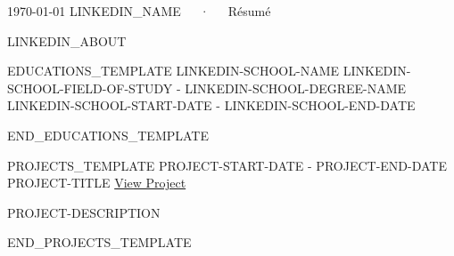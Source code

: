 \documentclass[11pt, a4paper]{awesome-cv}
\begin{document}
    \makecvheader[C]

    \makecvfooter
    {\today}
    {LINKEDIN_NAME~~~·~~~Résumé}
    {\thepage}



    \begin{cvparagraph}
        LINKEDIN_ABOUT
    \end{cvparagraph}

    \begin{cventries}

        EDUCATIONS_TEMPLATE
        \cventry
        {LINKEDIN-SCHOOL-NAME}
        {LINKEDIN-SCHOOL-FIELD-OF-STUDY - LINKEDIN-SCHOOL-DEGREE-NAME}
        {} %
        {LINKEDIN-SCHOOL-START-DATE - LINKEDIN-SCHOOL-END-DATE} %
        {
            \begin{cvitems} %
            \end{cvitems}
        }
        END_EDUCATIONS_TEMPLATE

    \end{cventries}

    \begin{cventries}


        PROJECTS_TEMPLATE
        \cventry
        {PROJECT-START-DATE - PROJECT-END-DATE}
        {PROJECT-TITLE} %
        {\href{PROJECT-LINK}{View Project}} %
        {}
        {
            \begin{cvitems} %
                \item {PROJECT-DESCRIPTION}
            \end{cvitems}
        }
        END_PROJECTS_TEMPLATE

    \end{cventries}

\end{document}
